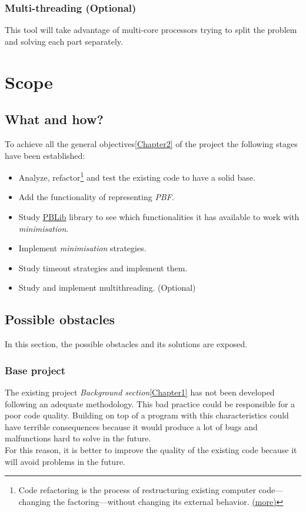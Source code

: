 \subsubsection{Multi-threading (Optional)}
This tool will take advantage of multi-core processors trying to split the problem and solving each part separately.

\section{Scope}
\subsection{What and how?}

To achieve all the general objectives\ref{Chapter2} of the project the following stages have been established:
\begin{itemize}
	\item Analyze, refactor\footnote{Code refactoring is the process of restructuring existing computer code—changing the factoring—without changing its external behavior. \href{https://en.wikipedia.org/wiki/Code_refactoring}{(more)}} and test the existing code to have a solid base. 
	\item Add the functionality of representing \emph{PBF}.
	\item Study \href{http://tools.computational-logic.org/content/pblib.php}{PBLib} library to see which functionalities it has available to work with \emph{minimisation}.
	\item Implement \emph{minimisation} strategies.
	\item Study timeout strategies and implement them.
	\item Study and implement multithreading. (Optional)
\end{itemize}

\subsection{Possible obstacles}

In this section, the possible obstacles and its solutions are exposed.

\subsubsection{Base project}
The existing project \emph{Background section}\ref{Chapter1} has not been developed following an adequate methodology. This bad practice could be responsible for a poor code quality. Building on top of a program with this characteristics could have terrible consequences because it would produce a lot of bugs and malfunctions hard to solve in the future. \\
For this reason, it is better to improve the quality of the existing code because it will avoid problems in the future.

